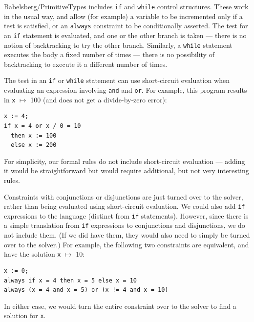 Babelsberg/PrimitiveTypes includes \verb|if| and \verb|while| control
structures.  These work in the usual way, and allow (for example) a
variable to be incremented only if a test is satisfied, or an
\verb|always| constraint to be conditionally asserted.  The test for
an \verb|if| statement is evaluated, and one or the other branch is
taken --- there is no notion of backtracking to try the other branch.
Similarly, a \verb|while| statement executes the body a fixed number
of times --- there is no possibility of backtracking to execute it a
different number of times.

The test in an \verb|if| or \verb|while| statement can use
short-circuit evaluation when evaluating an expression involving
\verb|and| and \verb|or|.  For example, this program  results in
\verb|x| $\mapsto$ 100 (and does not get a divide-by-zero error):

\begin{lstlisting}
x := 4;
if x = 4 or x / 0 = 10
  then x := 100
  else x := 200
\end{lstlisting}

For simplicity, our formal rules do not include short-circuit
evaluation --- adding it would be straightforward but would require
additional, but not very interesting rules.

Constraints with conjunctions or disjunctions are
just turned over to the solver, rather than being evaluated using
short-circuit evaluation.  We could also add \verb|if| expressions to
the language (distinct from \verb|if| statements).  However, since
there is a simple translation from \verb|if| expressions to
conjunctions and disjunctions, we do not include them.  (If we did have
them, they would also need to simply be turned over to the solver.)
For example, the following two constraints are equivalent, and have 
the solution \verb|x| $\mapsto$ 10:
\begin{lstlisting}
x := 0;
always if x = 4 then x = 5 else x = 10
always (x = 4 and x = 5) or (x != 4 and x = 10)
\end{lstlisting}
In either case, we would turn the entire constraint over to the solver
to find a solution for \verb|x|.


